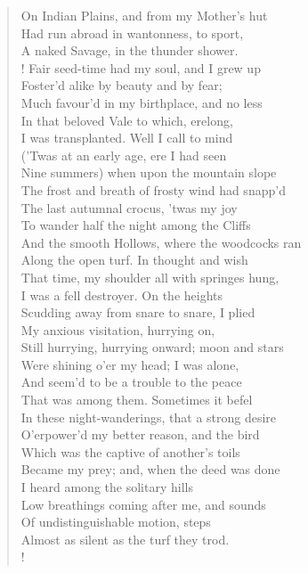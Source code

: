 \begin{verse}
On Indian Plains, and from my Mother's hut	  \\
Had run abroad in wantonness, to sport,  \\
A naked Savage, in the thunder shower.  \\!
Fair seed-time had my soul, and I grew up  \\
Foster'd alike by beauty and by fear;  \\
Much favour'd in my birthplace, and no less	  \\
In that beloved Vale to which, erelong,  \\
I was transplanted. Well I call to mind  \\
('Twas at an early age, ere I had seen  \\
Nine summers) when upon the mountain slope  \\
The frost and breath of frosty wind had snapp'd	  \\
The last autumnal crocus, 'twas my joy  \\
To wander half the night among the Cliffs  \\
And the smooth Hollows, where the woodcocks ran  \\
Along the open turf. In thought and wish  \\
That time, my shoulder all with springes hung,	  \\
I was a fell destroyer. On the heights  \\
Scudding away from snare to snare, I plied  \\
My anxious visitation, hurrying on,  \\
Still hurrying, hurrying onward; moon and stars  \\
Were shining o'er my head; I was alone,	  \\
And seem'd to be a trouble to the peace  \\
That was among them. Sometimes it befel  \\
In these night-wanderings, that a strong desire  \\
O'erpower'd my better reason, and the bird  \\
Which was the captive of another's toils	  \\
Became my prey; and, when the deed was done  \\
I heard among the solitary hills  \\
Low breathings coming after me, and sounds  \\
Of undistinguishable motion, steps  \\
Almost as silent as the turf they trod.	  \\!

\end{verse}
